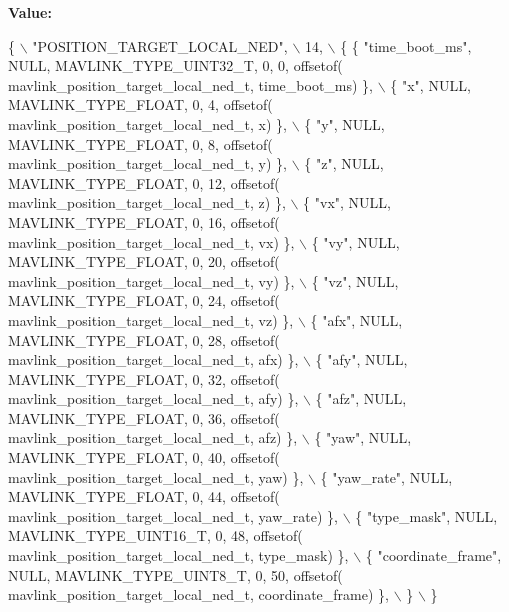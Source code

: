 {\bfseries Value\+:}
\begin{DoxyCode}
\{ \(\backslash\)
    \textcolor{stringliteral}{"POSITION\_TARGET\_LOCAL\_NED"}, \(\backslash\)
    14, \(\backslash\)
    \{  \{ \textcolor{stringliteral}{"time\_boot\_ms"}, NULL, MAVLINK_TYPE_UINT32_T, 0, 0, offsetof(
      mavlink_position_target_local_ned_t, time\_boot\_ms) \}, \(\backslash\)
         \{ \textcolor{stringliteral}{"x"}, NULL, MAVLINK_TYPE_FLOAT, 0, 4, offsetof(
      mavlink_position_target_local_ned_t, x) \}, \(\backslash\)
         \{ \textcolor{stringliteral}{"y"}, NULL, MAVLINK_TYPE_FLOAT, 0, 8, offsetof(
      mavlink_position_target_local_ned_t, y) \}, \(\backslash\)
         \{ \textcolor{stringliteral}{"z"}, NULL, MAVLINK_TYPE_FLOAT, 0, 12, offsetof(
      mavlink_position_target_local_ned_t, z) \}, \(\backslash\)
         \{ \textcolor{stringliteral}{"vx"}, NULL, MAVLINK_TYPE_FLOAT, 0, 16, offsetof(
      mavlink_position_target_local_ned_t, vx) \}, \(\backslash\)
         \{ \textcolor{stringliteral}{"vy"}, NULL, MAVLINK_TYPE_FLOAT, 0, 20, offsetof(
      mavlink_position_target_local_ned_t, vy) \}, \(\backslash\)
         \{ \textcolor{stringliteral}{"vz"}, NULL, MAVLINK_TYPE_FLOAT, 0, 24, offsetof(
      mavlink_position_target_local_ned_t, vz) \}, \(\backslash\)
         \{ \textcolor{stringliteral}{"afx"}, NULL, MAVLINK_TYPE_FLOAT, 0, 28, offsetof(
      mavlink_position_target_local_ned_t, afx) \}, \(\backslash\)
         \{ \textcolor{stringliteral}{"afy"}, NULL, MAVLINK_TYPE_FLOAT, 0, 32, offsetof(
      mavlink_position_target_local_ned_t, afy) \}, \(\backslash\)
         \{ \textcolor{stringliteral}{"afz"}, NULL, MAVLINK_TYPE_FLOAT, 0, 36, offsetof(
      mavlink_position_target_local_ned_t, afz) \}, \(\backslash\)
         \{ \textcolor{stringliteral}{"yaw"}, NULL, MAVLINK_TYPE_FLOAT, 0, 40, offsetof(
      mavlink_position_target_local_ned_t, yaw) \}, \(\backslash\)
         \{ \textcolor{stringliteral}{"yaw\_rate"}, NULL, MAVLINK_TYPE_FLOAT, 0, 44, offsetof(
      mavlink_position_target_local_ned_t, yaw\_rate) \}, \(\backslash\)
         \{ \textcolor{stringliteral}{"type\_mask"}, NULL, MAVLINK_TYPE_UINT16_T, 0, 48, offsetof(
      mavlink_position_target_local_ned_t, type\_mask) \}, \(\backslash\)
         \{ \textcolor{stringliteral}{"coordinate\_frame"}, NULL, MAVLINK_TYPE_UINT8_T, 0, 50, offsetof(
      mavlink_position_target_local_ned_t, coordinate\_frame) \}, \(\backslash\)
         \} \(\backslash\)
\}
\end{DoxyCode}
\mbox{\label{mavlink__msg__position__target__local__ned_8h_a0dc365c4c6fd883151a9cd221101ffdb}} 
